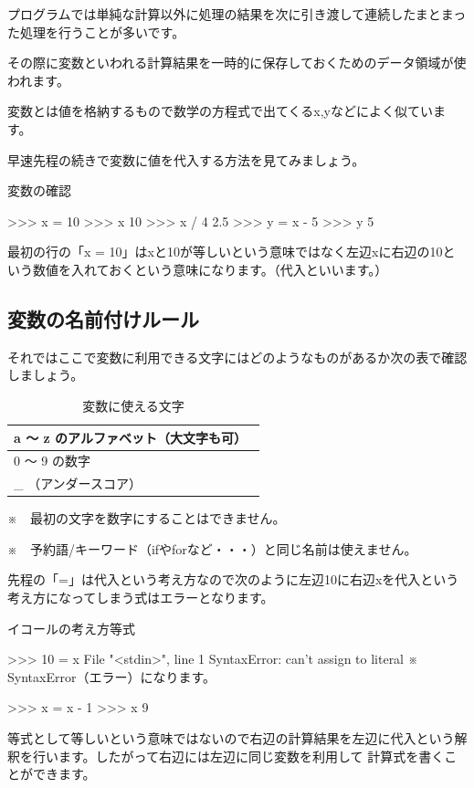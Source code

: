\documentclass[11pt,a4paper,dvipdfmx,titlepage]{jsreport}
\begin{document}
プログラムでは単純な計算以外に処理の結果を次に引き渡して連続したまとまった処理を行うことが多いです。

その際に変数といわれる計算結果を一時的に保存しておくためのデータ領域が使われます。

 変数とは値を格納するもので数学の方程式で出てくるx,yなどによく似ています。

早速先程の続きで変数に値を代入する方法を見てみましょう。

\begin{grabox}{変数の確認}
\begin{listingcont}
>>> x = 10
>>> x
10
>>> x / 4
2.5
>>> y = x - 5
>>> y
5
\end{listingcont}
\end{grabox}
最初の行の「x = 10」はxと10が等しいという意味ではなく左辺xに右辺の10という数値を入れておくという意味になります。（代入といいます。）

\subsection{変数の名前付けルール}
それではここで変数に利用できる文字にはどのようなものがあるか次の表で確認しましょう。
\newpage
\begin{table}[h]
 \begin{center}
    \caption{変数に使える文字}
\begin{tabular}{|p{10cm}|} \hline
a ～ z のアルファベット（大文字も可）　\\ \hline
0 〜 9 の数字 \\ \hline
\_ （アンダースコア） \\ \hline
\end{tabular}
\end{center}
\end{table}


\begin{description}

\item ※　最初の文字を数字にすることはできません。
\item ※　予約語/キーワード（ifやforなど・・・）と同じ名前は使えません。

\end{description}
 先程の「=」は代入という考え方なので次のように左辺10に右辺xを代入という考え方になってしまう式はエラーとなります。


\begin{grabox}{イコールの考え方等式}
\begin{listingcont}
>>> 10 = x
  File "<stdin>", line 1
SyntaxError: can't assign to literal
 ※ SyntaxError（エラー）になります。

>>> x = x - 1
>>> x
9
\end{listingcont}
\end{grabox}
等式として等しいという意味ではないので右辺の計算結果を左辺に代入という解釈を行います。したがって右辺には左辺に同じ変数を利用して
計算式を書くことができます。
\end{document}
